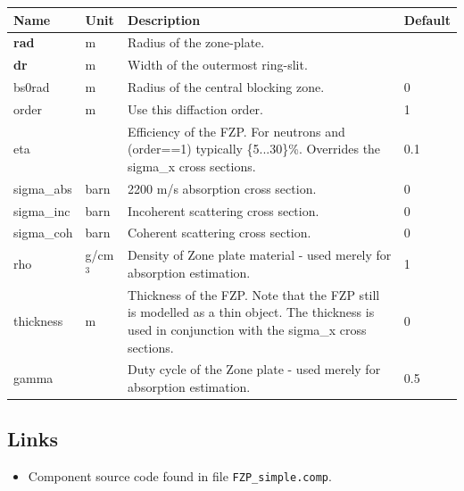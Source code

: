 \begin{longtable}{p{}p{}p{}p{}}
\toprule
\textbf{Name} & \textbf{Unit} & \textbf{Description} & \textbf{Default} \\
\midrule
\endhead
\textbf{rad} & m & Radius of  the zone-plate. &  \\
\textbf{dr} & m & Width of the outermost ring-slit. &  \\
bs0rad & m & Radius of the central blocking zone. & 0 \\
order & m & Use this diffaction order. & 1 \\
eta &   & Efficiency of the FZP. For neutrons and (order==1) typically \{5...30\}\%. Overrides the sigma\_x cross sections. & 0.1 \\
sigma\_abs & barn & 2200 m/s absorption cross section. & 0 \\
sigma\_inc & barn & Incoherent scattering cross section. & 0 \\
sigma\_coh & barn & Coherent scattering cross section. & 0 \\
rho & g/cm$^{3}$ & Density of Zone plate material - used merely for absorption estimation. & 1 \\
thickness & m & Thickness of the FZP. Note that the FZP still is modelled as a thin object. The thickness is used in conjunction with the sigma\_x cross sections. & 0 \\
gamma &   & Duty cycle of the Zone plate - used merely for absorption estimation. & 0.5 \\
\bottomrule
\end{longtable}

\subsection*{Links}
\begin{itemize}
  \item Component source code found in file \texttt{FZP\_simple.comp}.
\end{itemize}
